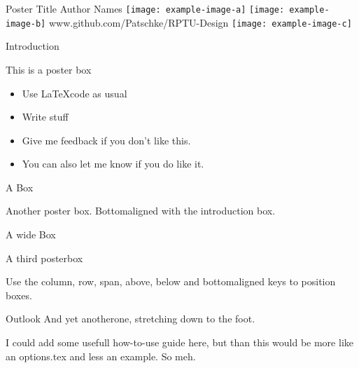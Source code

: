 \documentclass[
  a0paper,
  portrait,
  fontscale=.35 %
  ]{baposterrptu}
\begin{document}
\begin{poster}{
  }
  {\color{color_accents}\rptuLogo\hspace{1cm}}
  {\color{white}Poster Title}
  {\color{white}Author Names}
  {\texttt{[image: example-image-a]}}
  \footer
  {\hfill
    \texttt{[image: example-image-b]}
    \hfill
    \color{white} \huge www.github.com/Patschke/RPTU-Design
    \hfill
    \texttt{[image: example-image-c]}
    \hfill}
  \begin{posterbox}[name=intro,column=0,row=0]{Introduction}

    This is a poster box

    \begin{itemize}
      \item Use \LaTeX code as usual
      \item Write stuff
      \item Give me feedback if you don't like this.
      \item You can also let me know if you do like it.
    \end{itemize}

  \end{posterbox}

  \begin{posterbox}[name=test,column=1,row=0, bottomaligned=intro]{A Box}

    Another poster box. Bottomaligned with the introduction box.

  \end{posterbox}

  \begin{posterbox}[name=test2,column=0,below=intro, span=2]{A wide Box}

    A third posterbox

    Use the column, row, span, above, below and bottomaligned keys to position boxes.

  \end{posterbox}

  \begin{posterbox}[above=foot, below=test2, column=1]{Outlook}
    And yet anotherone, stretching down to the foot.

    I could add some usefull how-to-use guide here, but than this would be more like an options.tex and less an example. So meh.
  \end{posterbox}

\end{poster}
\end{document}
